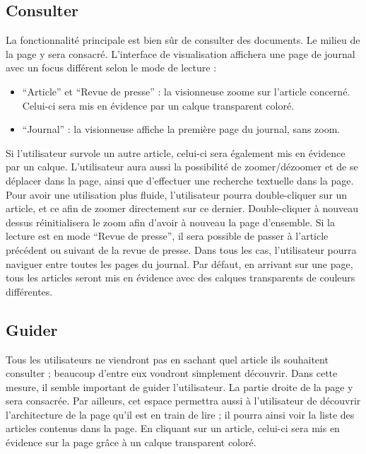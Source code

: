 \subsection{Consulter}
\label{sec:consultation_consulter}
La fonctionnalité principale est bien sûr de consulter des documents. Le milieu de la page y sera consacré.
L’interface de visualisation affichera une page de journal avec un focus différent selon le mode de lecture :
\begin{itemize}
\item “Article” et “Revue de presse” : la visionneuse zoome sur l’article concerné. Celui-ci sera mis en évidence par un calque transparent coloré.
\item “Journal” : la visionneuse affiche la première page du journal, sans zoom.
\end{itemize}
\bigskip
\par
Si l’utilisateur survole un autre article, celui-ci sera également mis en évidence par un calque.
	L’utilisateur aura aussi la possibilité de zoomer/dézoomer et de se déplacer dans la page, ainsi que d’effectuer une recherche textuelle dans la page. Pour avoir une utilisation plus fluide, l'utilisateur pourra double-cliquer sur un article, et ce afin de zoomer directement sur ce dernier. Double-cliquer à nouveau dessus réinitialisera le zoom afin d'avoir à nouveau la page d'ensemble. Si la lecture est en mode “Revue de presse”, il sera possible de passer à l’article précédent ou suivant de la revue de presse. Dans tous les cas, l'utilisateur pourra naviguer entre toutes les pages du journal. Par défaut, en arrivant sur une page, tous les articles seront mis en évidence avec des calques transparents de couleurs différentes.

\subsection{Guider}
\label{sec:consultation_guider}

	Tous les utilisateurs ne viendront pas en sachant quel article ils souhaitent consulter ; beaucoup d’entre eux voudront simplement découvrir. Dans cette mesure, il semble important de guider l’utilisateur. La partie droite de la page y sera consacrée. Par ailleurs, cet espace permettra aussi à l'utilisateur de découvrir l'architecture de la page qu'il est en train de lire ; il pourra ainsi voir la liste des articles contenus dans la page. En cliquant sur un article, celui-ci sera mis en évidence sur la page grâce à un calque transparent coloré.

